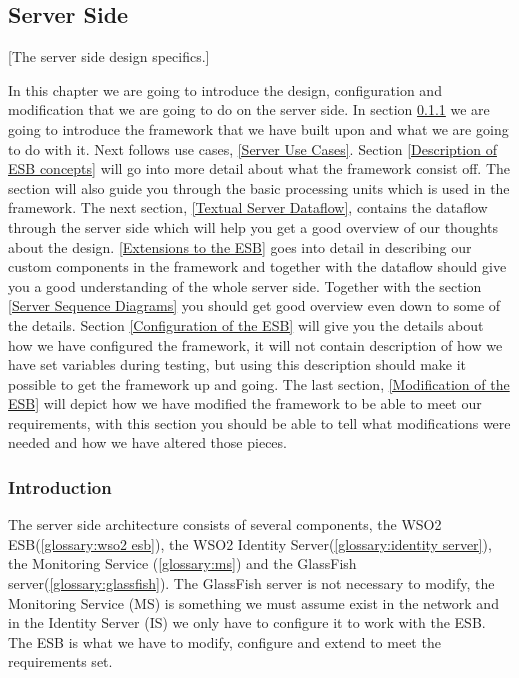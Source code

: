     \subsection{Server Side}\label{Server Side Design} [The server side design specifics.]

    In this chapter we are going to introduce the design, configuration and modification that we are going to do on the server side. In section \ref{Server Introduction} we are going to introduce the framework that we have built upon and what we are going to do with it. Next follows use cases, \ref{Server Use Cases}. Section \ref{Description of ESB concepts} will go into more detail about what the framework consist off. The section will also guide you through the basic processing units which is used in the framework. The next section, \ref{Textual Server Dataflow}, contains the dataflow through the server side which will help you get a good overview of our thoughts about the design. \ref{Extensions to the ESB} goes into detail in describing our custom components in the framework and together with the dataflow should give you a good understanding of the whole server side. Together with the section \ref{Server Sequence Diagrams} you should get good overview even down to some of the details. Section \ref{Configuration of the ESB} will give you the details about how we have configured the framework, it will not contain description of how we have set variables during testing, but using this description should make it possible to get the framework up and going. The last section, \ref{Modification of the ESB} will depict how we have modified the framework to be able to meet our requirements, with this section you should be able to tell what modifications were needed and how we have altered those pieces. 

    \subsubsection{Introduction}\label{Server Introduction}
    The server side architecture consists of several components, the WSO2 ESB(\ref{glossary:wso2 esb}), the WSO2 Identity Server(\ref{glossary:identity server}), the Monitoring Service (\ref{glossary:ms}) and the GlassFish server(\ref{glossary:glassfish}). The GlassFish server is not necessary to modify, the Monitoring Service (MS) is something we must assume exist in the network and in the Identity Server (IS) we only have to configure it to work with the ESB. The ESB is what we have to modify, configure and extend to meet the requirements set.

